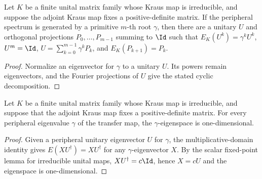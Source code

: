\begin{theorem}
    \label{thm:cyclic_decomposition_irreducible_schwarz}
    \leanok
    Let $K$ be a finite unital matrix family whose Kraus map is irreducible,
    and suppose the adjoint Kraus map fixes a positive-definite matrix. If the
    peripheral spectrum is generated by a primitive $m$-th root $\gamma$, then
    there are a unitary $U$ and orthogonal projections
    $P_0,\ldots,P_{m-1}$ summing to $\Id$ such that
    $E_K(U^k)=\gamma^kU^k$, $U^m=\Id$,
    $U=\sum_{k=0}^{m-1}\gamma^kP_k$, and $E_K(P_{k+1})=P_k$.
\end{theorem}

\begin{proof}
    \leanok
    Normalize an eigenvector for $\gamma$ to a unitary $U$. Its powers remain
    eigenvectors, and the Fourier projections of $U$ give the stated cyclic
    decomposition.
\end{proof}

\begin{theorem}
    \label{thm:peripheral_multiplicity_one}
    \leanok
    Let $K$ be a finite unital matrix family whose Kraus map is irreducible,
    and suppose that the adjoint Kraus map fixes a positive-definite matrix.
    For every peripheral eigenvalue $\gamma$ of the transfer map, the
    $\gamma$-eigenspace is one-dimensional.
\end{theorem}

\begin{proof}\leanok
    Given a peripheral unitary eigenvector $U$ for $\gamma$, the
    multiplicative-domain identity gives
    $E(XU^\dagger)=XU^\dagger$ for any $\gamma$-eigenvector $X$.
    By the scalar fixed-point lemma for irreducible unital maps,
    $XU^\dagger=c\Id$, hence $X=cU$ and the eigenspace is one-dimensional.
\end{proof}
